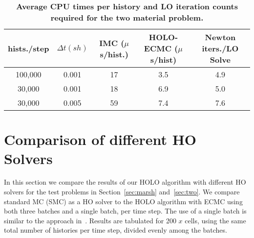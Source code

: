 \begin{table}[htb!]
\centering
\caption{\label{twomat_table} \textbf{Average CPU times per history and LO iteration
counts required for the two material problem.}}
	\begin{tabular}{|cc|c|cc|} \hline
hists./step & $\Delta t (sh)$ & IMC ($\mu$s/hist.) & HOLO-ECMC ($\mu$s/hist)  &
Newton iters./LO Solve\\ \hline
100,000          &   0.001	& 17  &	3.5   & 4.9 \\
30,000   &    0.001	& 18  &	6.9   &    5.0 \\
30,000    &   0.005	& 59  & 7.4   &    7.6 \\ \hline
\end{tabular}
\end{table}

\section{Comparison of different HO Solvers}
\label{ho_solvers}

In this section we compare the results of our HOLO algorithm with different HO
solvers for the test problems in Section~\ref{sec:marsh} and~\ref{sec:two}.  We compare standard MC (SMC) as a HO solver to the HOLO algorithm with ECMC using
both three batches and a single batch, per time step.  The use of a single batch is
similar to the approach in~\cite{rmc}.  Results are tabulated for 200 $x$ cells, using the same total
number of histories per time step, divided evenly among the batches.

